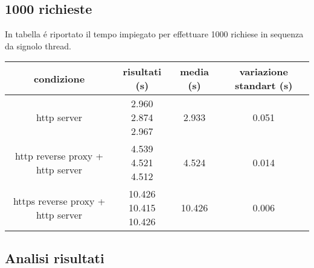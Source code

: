\subsection{1000 richieste}
In tabella é riportato il tempo impiegato per effettuare 1000 richiese in sequenza da signolo thread.
\begin{center}
  \begin{tabular}{|c|c|c|c|}
    \hline
    condizione & risultati (s) & media (s) & variazione standart (s) \\
    \hline
    \hline
    http server & \makecell {2.960 \\ 2.874 \\ 2.967} & 2.933 & 0.051 \\
    \hline
    http reverse proxy + http server & \makecell {4.539 \\ 4.521 \\ 4.512} & 4.524 & 0.014 \\
    \hline
    https reverse proxy + http server & \makecell {10.426 \\ 10.415 \\ 10.426} & 10.426 & 0.006 \\
    \hline
  \end{tabular}
\end{center}

\begin{center}
\end{center}

\subsection{Analisi risultati}
